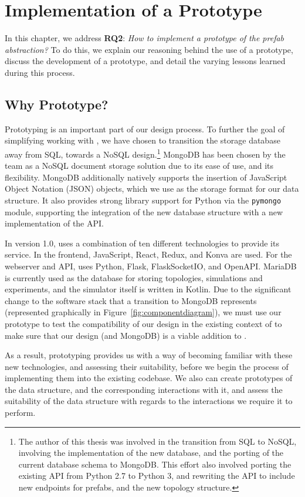 \documentclass[11pt]{article}
\begin{document}
\section{Implementation of a Prototype} \label{sec:prototype}
	In this chapter, we address \textbf{RQ2}: \textit{How to implement a prototype of the prefab abstraction?}
	To do this, we explain our reasoning behind the use of a prototype, discuss the development of a prototype, and detail the varying lessons learned during this process.
	\subsection{Why Prototype?}
		Prototyping is an important part of our design process.
		To further the goal of simplifying working with \opendc{}, we have chosen to transition the storage database away from SQL, towards a NoSQL design.\footnote{The author of this thesis was involved in the transition from SQL to NoSQL, involving the implementation of the new database, and the porting of the current database schema to MongoDB. 
		This effort also involved porting the existing \opendc{} API from Python 2.7 to Python 3, and rewriting the API to include new endpoints for prefabs, and the new topology structure.}
		MongoDB has been chosen by the \opendc{} team as a NoSQL document storage solution due to its ease of use, and its flexibility.
		MongoDB additionally natively supports the insertion of JavaScript Object Notation (JSON) objects, which we use as the storage format for our data structure.
		It also provides strong library support for Python via the \verb|pymongo| module, supporting the integration of the new database structure with a new implementation of the \opendc{} API.

		In version 1.0, \opendc{} uses a combination of ten different technologies to provide its service.
		In the frontend, JavaScript, React, Redux, and Konva are used. For the webserver and API, \opendc{} uses Python, Flask, FlaskSocketIO, and OpenAPI.
		MariaDB is currently used as the database for storing topologies, simulations and experiments, and the simulator itself is written in Kotlin.
		Due to the significant change to the software stack that a transition to MongoDB represents (represented graphically in Figure~\ref{fig:componentdiagram}), we must use our prototype to test the compatibility of our design in the existing context of \opendc{} to make sure that our design (and MongoDB) is a viable addition to \opendc{}.

		As a result, prototyping provides us with a way of becoming familiar with these new technologies, and assessing their suitability, before we begin the process of implementing them into the existing \opendc{} codebase.
		We also can create prototypes of the data structure, and the corresponding interactions with it, and assess the suitability of the data structure with regards to the interactions we require it to perform.
\end{document}
